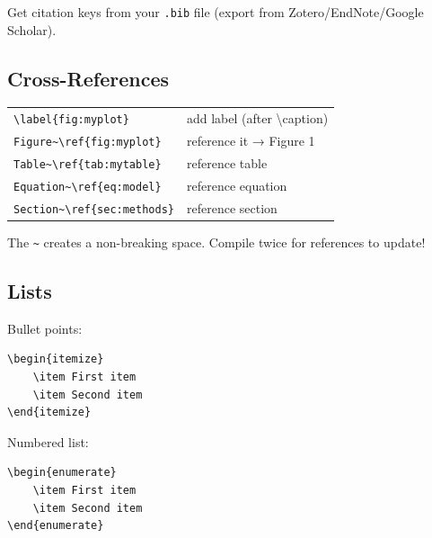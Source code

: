 \documentclass[../main.tex]{subfiles}
\begin{document}
\vspace{0.5em}

Get citation keys from your \texttt{.bib} file (export from Zotero/EndNote/Google Scholar).

\vspace{1em}

\subsection*{Cross-References}
\begin{tabular}{ll}
\texttt{\textbackslash label\{fig:myplot\}} & add label (after \textbackslash caption) \\
\texttt{Figure\~{}\textbackslash ref\{fig:myplot\}} & reference it → Figure 1 \\
\texttt{Table\~{}\textbackslash ref\{tab:mytable\}} & reference table \\
\texttt{Equation\~{}\textbackslash ref\{eq:model\}} & reference equation \\
\texttt{Section\~{}\textbackslash ref\{sec:methods\}} & reference section \\
\end{tabular}

\vspace{0.5em}

The \texttt{\~{}} creates a non-breaking space. Compile twice for references to update!

\vspace{1em}

\subsection*{Lists}
\begin{minipage}[t]{0.45\textwidth}
Bullet points:
\begin{verbatim}
\begin{itemize}
    \item First item
    \item Second item
\end{itemize}
\end{verbatim}
\end{minipage}
\hfill
\begin{minipage}[t]{0.45\textwidth}
Numbered list:
\begin{verbatim}
\begin{enumerate}
    \item First item
    \item Second item
\end{enumerate}
\end{verbatim}
\end{minipage}
\end{document}

